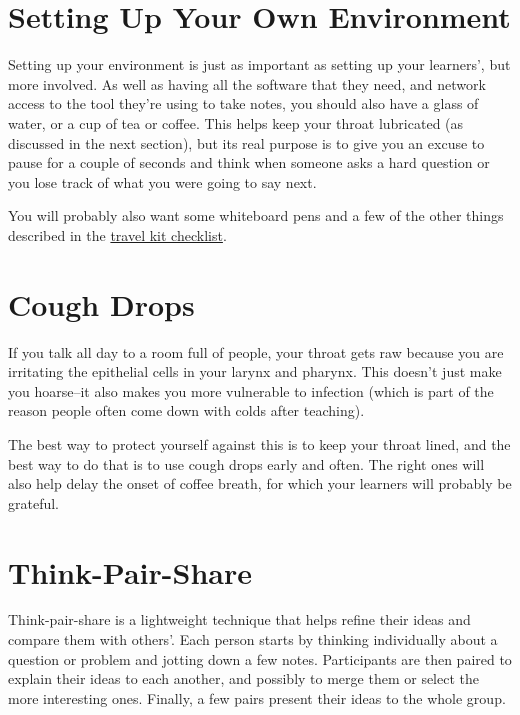 \documentclass[10pt,statementpaper]{memoir}
\begin{document}
\section{Setting Up Your Own
Environment}\label{setting-up-your-own-environment}

Setting up your environment is just as important as setting up your
learners', but more involved. As well as having all the software that
they need, and network access to the tool they're using to take notes,
you should also have a glass of water, or a cup of tea or coffee. This
helps keep your throat lubricated (as discussed in the next section),
but its real purpose is to give you an excuse to pause for a couple of
seconds and think when someone asks a hard question or you lose track of
what you were going to say next.

You will probably also want some whiteboard pens and a few of the other
things described in the \href{checklists.html\#travel-kit}{travel kit
checklist}.

\section{Cough Drops}\label{cough-drops}

If you talk all day to a room full of people, your throat gets raw
because you are irritating the epithelial cells in your larynx and
pharynx. This doesn't just make you hoarse--it also makes you more
vulnerable to infection (which is part of the reason people often come
down with colds after teaching).

The best way to protect yourself against this is to keep your throat
lined, and the best way to do that is to use cough drops early and
often. The right ones will also help delay the onset of coffee breath,
for which your learners will probably be grateful.

\section{Think-Pair-Share}\label{think-pair-share}

Think-pair-share is a lightweight technique that helps refine their
ideas and compare them with others'. Each person starts by thinking
individually about a question or problem and jotting down a few notes.
Participants are then paired to explain their ideas to each another, and
possibly to merge them or select the more interesting ones. Finally, a
few pairs present their ideas to the whole group.
\end{document}
